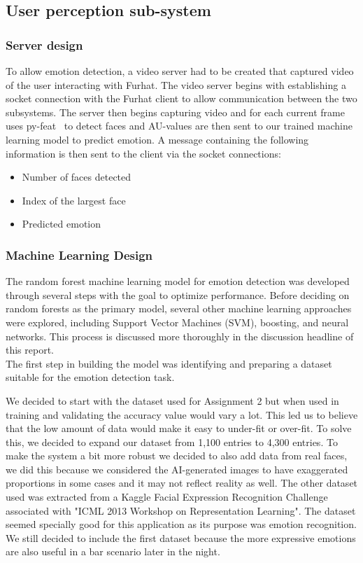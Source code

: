 \documentclass[conference]{IEEEtran}
\begin{document}
\subsection{User perception sub-system}

\subsubsection{Server design}\label{sec:serverdesign}
To allow emotion detection, a video server had to be created that captured video of the user interacting with Furhat. The video server begins with establishing a socket connection with the Furhat client to allow communication between the two subsystems. The server then begins capturing video and for each current frame uses py-feat~\cite{py-feat} to detect faces and AU-values are then sent to our trained machine learning model to predict emotion. A message containing the following information is then sent to the client via the socket connections:
\begin{itemize}
    \item Number of faces detected
    \item Index of the largest face
    \item Predicted emotion
\end{itemize}
\subsubsection{Machine Learning Design}
The random forest machine learning model for emotion detection was developed through several steps with the goal to optimize performance. Before deciding on random forests as the primary model, several other machine learning approaches were explored, including Support Vector Machines (SVM), boosting, and neural networks. This process is discussed more thoroughly in the discussion headline of this report.\\ The first step in building the model was identifying and preparing a dataset suitable for the emotion detection task.

We decided to start with the dataset used for Assignment 2 but when used in training and validating the accuracy value would vary a lot. This led us to believe that the low amount of data would make it easy to under-fit or over-fit. To solve this, we decided to expand our dataset from 1,100 entries to 4,300 entries. To make the system a bit more robust we decided to also add data from real faces, we did this because we considered the AI-generated images to have exaggerated proportions in some cases and it may not reflect reality as well. The other dataset used was extracted from a Kaggle Facial Expression Recognition Challenge \cite{kaggle} associated with "ICML 2013 Workshop on Representation Learning". The dataset seemed specially good for this application as its purpose was emotion recognition.
We still decided to include the first dataset because the more expressive emotions are also useful in a bar scenario later in the night.
\end{document}
